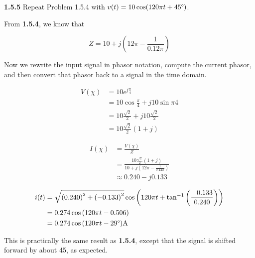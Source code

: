 \documentclass{article}
\begin{document}
\textbf{1.5.5} Repeat Problem 1.5.4 with $v(t) = 10\cos(120\pi t + 45 \degree)$.

\vspace{24pt}

From \textbf{1.5.4}, we know that

\begin{equation*}
	Z = 10 + j\left(12\pi - \frac{1}{0.12\pi}\right)
\end{equation*}

Now we rewrite the input signal in phasor notation, compute the current phasor, and then convert that phasor back to a
signal in the time domain.

\begin{equation*}
	\begin{split}
		V(\chi) & = 10e^{j\frac{\pi}{4}} \\
		& = 10\cos{\frac{\pi}{4}} + j10\sin{\pi}{4} \\
		& = 10\frac{\sqrt{2}}{2} + j10\frac{\sqrt{2}}{2} \\
		& = 10\frac{\sqrt{2}}{2}(1 + j)
	\end{split}
\end{equation*}

\begin{equation*}
	\begin{split}
		I(\chi) & = \frac{V(\chi)}{Z} \\
		& = \frac{10\frac{\sqrt{2}}{2}(1 + j)}{10 + j\left(12\pi - \frac{1}{0.12\pi}\right)} \\
		& \approx 0.240 - j0.133
	\end{split}
\end{equation*}

\begin{equation*}
	\begin{split}
		i(t) & = \sqrt{{(0.240)}^2 + {(-0.133)}^2}\cos{\left(
			120\pi t + \tan^{-1}\left(\frac{-0.133}{0.240}\right)
			\right)} \\
		& = 0.274\cos{(120\pi t - 0.506)} \\
		& = 0.274\cos{(120\pi t - 29 \degree)} \text{A}
	\end{split}
\end{equation*}

This is practically the same result as \textbf{1.5.4}, except that the signal is shifted forward by about 45\degree, as
expected.
\end{document}
